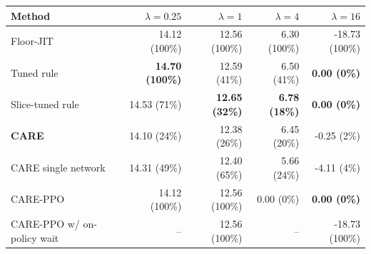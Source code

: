 \begin{tabular}{lrrrr}
\toprule
Method & $\lambda=0.25$ & $\lambda=1$ & $\lambda=4$ & $\lambda=16$\\
\midrule
Floor-JIT & 14.12 (100\%) & 12.56 (100\%) & 6.30 (100\%) & -18.73 (100\%)\\
Tuned rule & \textbf{14.70 (100\%)} & 12.59 (41\%) & 6.50 (41\%) & \textbf{0.00 (0\%)}\\
Slice-tuned rule & 14.53 (71\%) & \textbf{12.65 (32\%)} & \textbf{6.78 (18\%)} & \textbf{0.00 (0\%)}\\
\textbf{CARE} & 14.10 (24\%) & 12.38 (26\%) & 6.45 (20\%) & -0.25 (2\%)\\
CARE single network & 14.31 (49\%) & 12.40 (65\%) & 5.66 (24\%) & -4.11 (4\%)\\
CARE-PPO & 14.12 (100\%) & 12.56 (100\%) & 0.00 (0\%) & \textbf{0.00 (0\%)}\\
CARE-PPO w/ on-policy wait & -- & 12.56 (100\%) & -- & -18.73 (100\%)\\
\bottomrule
\end{tabular}
